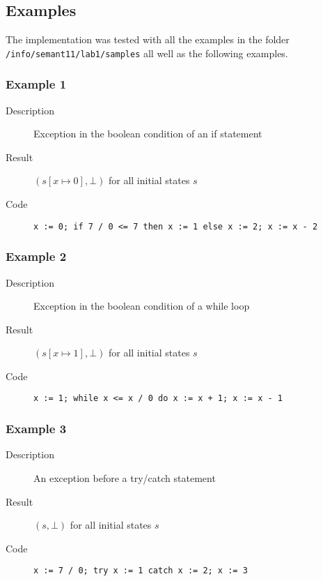 \documentclass[11pt,oneside,a4paper]{article}
\begin{document}
\subsection*{Examples}
The implementation was tested with all the examples in the folder 
\texttt{/info/semant11/lab1/samples} all well as the following examples.
\subsubsection*{Example 1}
\begin{description}
\item[Description] Exception in the boolean condition of an if statement 
\item[Result] \((s[x \mapsto 0], \bot)\) for all initial states \(s\)
\item[Code]
\begin{verbatim}
x := 0; if 7 / 0 <= 7 then x := 1 else x := 2; x := x - 2 
\end{verbatim}
\end{description}

\subsubsection*{Example 2}
\begin{description}
\item[Description] Exception in the boolean condition of a while loop
\item[Result] \((s[x \mapsto 1], \bot)\) for all initial states \(s\)
\item[Code]
\begin{verbatim}
x := 1; while x <= x / 0 do x := x + 1; x := x - 1
\end{verbatim}
\end{description}

\subsubsection*{Example 3}
\begin{description}
\item[Description] An exception before a try/catch statement
\item[Result] \((s, \bot)\) for all initial states \(s\)
\item[Code]
\begin{verbatim}
x := 7 / 0; try x := 1 catch x := 2; x := 3
\end{verbatim}
\end{description}
\end{document}
